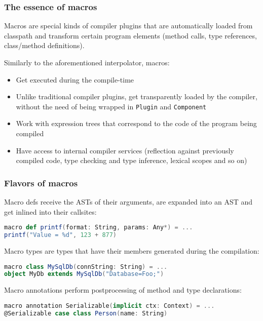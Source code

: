 \documentclass[hyperref={bookmarks=false}]{beamer}
\begin{document}
\begin{frame}[t,fragile]
\frametitle{The essence of macros}

Macros are special kinds of compiler plugins that are automatically loaded from classpath and transform certain program elements (method calls, type references, class/method definitions).

Similarly to the aforementioned interpolator, macros:
\begin{itemize}
\item Get executed during the compile-time
\item Unlike traditional compiler plugins, get transparently loaded by the compiler, without the need of being wrapped in \texttt{Plugin} and \texttt{Component}
\item Work with expression trees that correspond to the code of the program being compiled
\item Have access to internal compiler services (reflection against previously compiled code, type checking and type inference, lexical scopes and so on)
\end{itemize}
\end{frame}

\begin{frame}[t,fragile]
\frametitle{Flavors of macros}

Macro defs receive the ASTs of their arguments, are expanded into an AST and get inlined into their callsites:

\begin{lstlisting}[language=scala]
macro def printf(format: String, params: Any*) = ...
printf("Value = %d", 123 + 877)
\end{lstlisting}

Macro types are types that have their members generated during the compilation:

\begin{lstlisting}[language=scala]
macro class MySqlDb(connString: String) = ...
object MyDb extends MySqlDb("Database=Foo;")
\end{lstlisting}

Macro annotations perform postprocessing of method and type declarations:

\begin{lstlisting}[language=scala]
macro annotation Serializable(implicit ctx: Context) = ...
@Serializable case class Person(name: String)
\end{lstlisting}
\end{frame}
\end{document}
